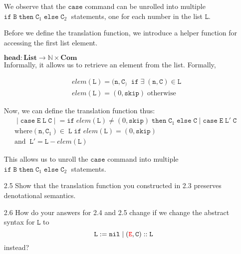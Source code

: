 \documentclass[a4paper,10pt]{article}
\newcommand{\E}{\mathtt{E}}
\newcommand{\B}{\mathtt{B}}
\newcommand{\C}{\mathtt{C}}
\newcommand{\LL}{\mathtt{L}}
\newcommand{\ifsym}{\mathtt{if}}
\newcommand{\then}{\mathtt{then}}
\newcommand{\elsesym}{\mathtt{else}}
\newcommand{\skipsym}{\mathtt{skip}}
\newcommand{\nil}{\mathtt{nil}}
\newcommand{\case}{\mathtt{case}}
\newcommand{\question}[1]
{\color{DarkBlue}#1 \color{Black} \newline}
\begin{document}
\begin{enumerate}
We observe that the $\case$ command can be unrolled into multiple $\ifsym \; \B
\; \then \; \C_1 \; \elsesym \; \C_2 \;$ statements, one for each number in the
list $\LL$.

Before we define the translation function, we introduce a helper function
for accessing the first list element.

$\textbf{head} : \textbf{List} \rightarrow \mathbb{N} \times \textbf{Com} $ \\

Informally, it allows us to retrieve an element from the list. Formally,

\begin{align*}
& elem(\LL) = (\mathtt{n}, \C_) \; \; \ifsym \; \exists \; (\mathtt{n},\C)  \in
\LL\\
& elem(\LL) = (0, \skipsym) \; \text{otherwise} 
\end{align*}  

Now, we can define the translation function thus:
\begin{align*}
& \; | \; \case \; \E \; \LL \; \C \; |\; = 
\ifsym \; elem(\LL) \neq (0, \skipsym)  \; 
\then \; \C_1 \; \elsesym \; \C \; 
| \; \case \; \E \; \LL' \; \C \; \\
& \text{where} (\mathtt{n},\C_1) \in \; \LL  \; \ifsym \; elem(\LL) = (0,
\skipsym) \\
& \text{and} \; \; \LL' = \LL - elem(\LL)
\end{align*} 

This allows us to unroll the $\case$ command into multiple $\ifsym \; \B \;
\then \; \C_1 \; \elsesym \; \C_2 \;$ statements.

\question{
\item[2.5] Show that the translation function you constructed in 2.3 preserves denotational semantics.
}

\question{
\item[2.6] How do your answers for 2.4 and 2.5 change if we change the abstract syntax for $\LL$ to
\[ \LL := \nil \; | \; ({\color{red} \E},\C)::\LL \]
instead?
}

\end{enumerate}
\end{document}
